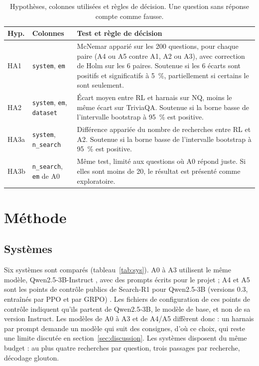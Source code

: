 \begin{table}[ht]
\centering\small
\begin{tabular}{@{}lp{3.5cm}p{8.6cm}@{}}
\toprule
Hyp. & Colonnes & Test et règle de décision\\
\midrule
HA1 & \texttt{system}, \texttt{em} & McNemar apparié sur les 200 questions, pour chaque paire (A4 ou A5 contre A1, A2 ou A3), avec correction de Holm sur les 6 paires. Soutenue si les 6 écarts sont positifs et significatifs à 5~\%, partiellement si certains le sont seulement.\\
HA2 & \texttt{system}, \texttt{em}, \texttt{dataset} & Écart moyen entre RL et harnais sur NQ, moins le même écart sur TriviaQA. Soutenue si la borne basse de l'intervalle bootstrap à 95~\% est positive.\\
HA3a & \texttt{system}, \texttt{n\_search} & Différence appariée du nombre de recherches entre RL et A2. Soutenue si la borne basse de l'intervalle bootstrap à 95~\% est positive.\\
HA3b & \texttt{n\_search}, \texttt{em} de A0 & Même test, limité aux questions où A0 répond juste. Si elles sont moins de 20, le résultat est présenté comme exploratoire.\\
\bottomrule
\end{tabular}
\caption{Hypothèses, colonnes utilisées et règles de décision. Une question sans réponse compte comme fausse.}
\label{tab:test}
\end{table}

\section{Méthode}\label{sec:methode}

\subsection{Systèmes}
Six systèmes sont comparés (tableau~\ref{tab:sys}). A0 à A3 utilisent le même modèle, Qwen2.5-3B-Instruct \citep{qwen2024qwen2}, avec des prompts écrits pour le projet ; A4 et A5 sont les points de contrôle publics de Search-R1 pour Qwen2.5-3B (versions 0.3, entraînés par PPO et par GRPO) \citep{jin2025search}. Les fichiers de configuration de ces points de contrôle indiquent qu'ils partent de Qwen2.5-3B, le modèle de base, et non de sa version Instruct. Les modèles de A0 à A3 et de A4/A5 diffèrent donc : un harnais par prompt demande un modèle qui suit des consignes, d'où ce choix, qui reste une limite discutée en section~\ref{sec:discussion}. Les systèmes disposent du même budget : au plus quatre recherches par question, trois passages par recherche, décodage glouton.

